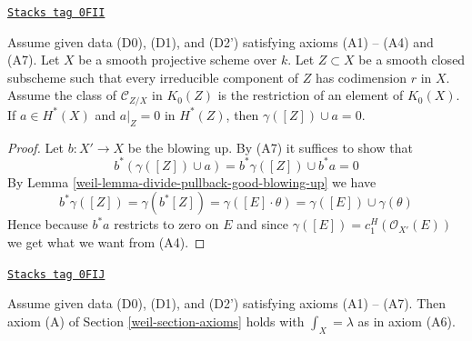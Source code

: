 \begin{lemma}[A5 A6 imply]
\label{weil-lemma-A5-A6-imply}
\href{https://stacks.math.columbia.edu/tag/0FII}{\texttt{Stacks tag 0FII}}

Assume given data (D0), (D1), and (D2') satisfying axioms (A1) -- (A4)
and (A7). Let $X$ be a smooth projective scheme over $k$. Let $Z \subset X$
be a smooth closed subscheme such that every irreducible component of $Z$
has codimension $r$ in $X$. Assume the class of
$\mathcal{C}_{Z/X}$ in $K_0(Z)$ is the restriction of an element of $K_0(X)$.
If $a \in H^*(X)$ and $a|_Z = 0$ in $H^*(Z)$, then
$\gamma([Z]) \cup a = 0$.
\end{lemma}

\begin{proof}

Let $b : X' \to X$ be the blowing up. By (A7) it suffices to show
that
$$
b^*(\gamma([Z]) \cup a) = b^*\gamma([Z]) \cup b^*a = 0
$$
By Lemma \ref{weil-lemma-divide-pullback-good-blowing-up} we have
$$
b^*\gamma([Z]) = \gamma(b^*[Z]) =
\gamma([E] \cdot \theta) =
\gamma([E]) \cup \gamma(\theta)
$$
Hence because $b^*a$ restricts to zero on $E$ and since
$\gamma([E]) = c^H_1(\mathcal{O}_{X'}(E))$ we get what we want from (A4).
\end{proof}

\begin{lemma}
\label{weil-lemma-poincare-duality}
\href{https://stacks.math.columbia.edu/tag/0FIJ}{\texttt{Stacks tag 0FIJ}}

Assume given data (D0), (D1), and (D2') satisfying axioms (A1) -- (A7).
Then axiom (A) of Section \ref{weil-section-axioms} holds with
$\int_X = \lambda$ as in axiom (A6).
\end{lemma}

